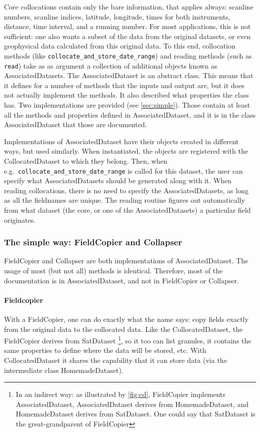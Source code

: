 \documentclass[a4paper,10pt]{article}
\begin{document}
Core collocations contain only the bare information, that applies always:
scanline numbers, scanline indices, latitude, longitude, times for both
instruments, distance, time interval, and a running number.
For most applications, this is not sufficient: one also wants a subset of the
data from the original datasets, or even geophysical data calculated from this
original data.
To this end, collocation methods (like
\lstinline|collocate_and_store_date_range|) and reading methods (such as
\lstinline|read|) take as as argument a collection of additional objects known
as AssociatedDatasets.
The AssociatedDataset is an abstract class.
This means that it defines for a number of methods that the inputs and output
are, but it does not actually implement the methods.
It also described what properties the class has.
Two implementations are provided (see \autoref{sec:simple}).
Those contain at least all the methods and properties defined in AssociatedDataset,
and it is in the class AssociatedDataset that those are documented.

Implementations of AssociatedDataset have their objects created in different ways, but used
similarly.
When instantiated, the objects are registered with the CollocatedDataset to which
they belong.
Then, when e.g.\ \lstinline|collocate_and_store_date_range| is called for this
dataset, the user can specify what AssociatedDatasets should be generated along
with it.
When reading collocations, there is no need to specify the
AssociatedDatasets, as long as all the fieldnames are unique.
The reading routine figures out automatically from what dataset (the core, or one
of the AssociatedDatasets) a particular field originates.

\subsubsection{The simple way: FieldCopier and Collapser}
\label{sec:simple}

FieldCopier and Collapser are both implementations of AssociatedDataset.
The usage of most (but not all) methods is identical.
Therefore, most of the documentation is in AssociatedDataset, and not in
FieldCopier or Collapser.

\paragraph{Fieldcopier}

With a FieldCopier, one can do exactly what the name says: copy fields exactly
from the original data to the collocated data.
Like the CollocatedDataset, the FieldCopier derives from SatDataset%
\footnote{In an indirect way: as illustrated by \autoref{fig:cd}, FieldCopier
implements AssociatedDataset, AssociatedDataset derives from HomemadeDataset,
and HomemadeDataset derives from SatDataset.
One could say that SatDataset is the great-grandparent of FieldCopier}, so it
too can list granules, it contains the same properties to define where the data
will be stored, etc.
With CollocatedDataset it shares the capability that it can store data (via
the intermediate class HomemadeDataset).
\end{document}
